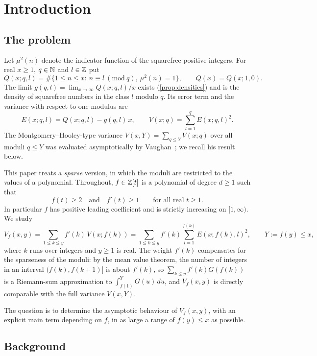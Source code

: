 \section{Introduction}\label{sec:intro}

\subsection{The problem}

Let $\mu^2(n)$ denote the indicator function of the squarefree positive integers. For real $x\ge1$, $q\in\mathbb{N}$ and $l\in\mathbb{Z}$ put
\[
Q(x;q,l)=\#\{1\le n\le x:\ n\equiv l\ (\mathrm{mod}\ q),\ \mu^2(n)=1\},\qquad Q(x)=Q(x;1,0).
\]
The limit $g(q,l)=\lim_{x\to\infty}Q(x;q,l)/x$ exists (\cref{prop:densities}) and is the density of squarefree numbers in the class $l$ modulo $q$. Its error term and the variance with respect to one modulus are
\[
E(x;q,l)=Q(x;q,l)-g(q,l)\,x,\qquad V(x;q)=\sum_{l=1}^{q}E(x;q,l)^2 .
\]
The Montgomery--Hooley-type variance $V(x,Y)=\sum_{q\le Y}V(x;q)$ over all moduli $q\le Y$ was evaluated asymptotically by Vaughan~\cite{Vaughan2005}; we recall his result below.

This paper treats a \emph{sparse} version, in which the moduli are restricted to the values of a polynomial. Throughout, $f\in\mathbb{Z}[t]$ is a polynomial of degree $d\ge1$ such that
\begin{equation}\label{eq:f-hyp}
f(t)\ge2\quad\text{and}\quad f'(t)\ge1\qquad\text{for all real }t\ge1 .
\end{equation}
In particular $f$ has positive leading coefficient and is strictly increasing on $[1,\infty)$. We study
\begin{equation}\label{eq:Vf}
V_f(x,y)=\sum_{1\le k\le y}f'(k)\,V(x;f(k))=\sum_{1\le k\le y}f'(k)\sum_{l=1}^{f(k)}E(x;f(k),l)^2,\qquad Y:=f(y)\le x,
\end{equation}
where $k$ runs over integers and $y\ge1$ is real. The weight $f'(k)$ compensates for the sparseness of the moduli: by the mean value theorem, the number of integers in an interval $(f(k),f(k+1)]$ is about $f'(k)$, so $\sum_{k\le y}f'(k)G(f(k))$ is a Riemann-sum approximation to $\int_{f(1)}^{Y}G(u)\,du$, and $V_f(x,y)$ is directly comparable with the full variance $V(x,Y)$.

The question is to determine the asymptotic behaviour of $V_f(x,y)$, with an explicit main term depending on $f$, in as large a range of $f(y)\le x$ as possible.

\subsection{Background}

